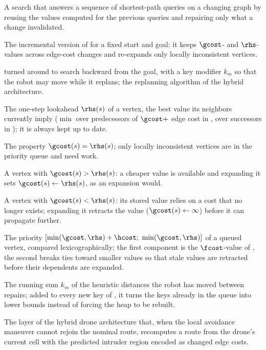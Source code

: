 \item[Incremental search] A search that answers a sequence of shortest-path queries on a changing graph by reusing the values computed for the previous queries and repairing only what a change invalidated.
\item[Lifelong Planning A* (LPA*)] The incremental version of \astar for a fixed start and goal: it keeps $\gcost$- and $\rhs$-values across edge-cost changes and re-expands only locally inconsistent vertices.
\item[D* Lite] \lpastar turned around to search backward from the goal, with a key modifier $k_m$ so that the robot may move while it replans; the replanning algorithm of the hybrid architecture.
\item[rhs-value] The one-step lookahead $\rhs(s)$ of a vertex, the best value its neighbors currently imply ($\min$ over predecessors of $\gcost + $ edge cost in \lpastar, over successors in \dstarlite); it is always kept up to date.
\item[Local consistency] The property $\gcost(s)=\rhs(s)$; only locally inconsistent vertices are in the priority queue and need work.
\item[Overconsistent vertex] A vertex with $\gcost(s)>\rhs(s)$: a cheaper value is available and expanding it sets $\gcost(s)\gets\rhs(s)$, as an \astar expansion would.
\item[Underconsistent vertex] A vertex with $\gcost(s)<\rhs(s)$: its stored value relies on a cost that no longer exists; expanding it retracts the value ($\gcost(s)\gets\infty$) before it can propagate further.
\item[Two-component key] The priority $[\min(\gcost,\rhs)+\hcost;\ \min(\gcost,\rhs)]$ of a queued vertex, compared lexicographically; the first component is the $\fcost$-value of \astar, the second breaks ties toward smaller values so that stale values are retracted before their dependents are expanded.
\item[Key modifier] The running sum $k_m$ of the heuristic distances the robot has moved between repairs; added to every new key of \dstarlite, it turns the keys already in the queue into lower bounds instead of forcing the heap to be rebuilt.
\item[Replanning layer] The layer of the hybrid drone architecture that, when the local avoidance maneuver cannot rejoin the nominal route, recomputes a route from the drone's current cell with the predicted intruder region encoded as changed edge costs.
